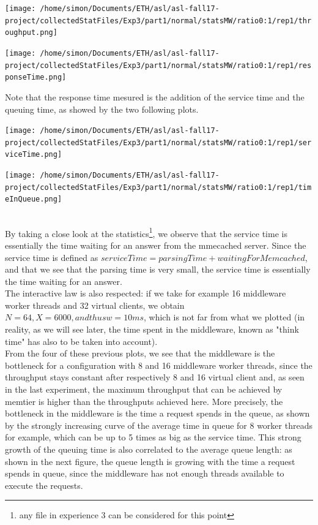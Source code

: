 \documentclass[11pt,a4paper]{article}
\begin{document}
\begin{center}
\texttt{[image: /home/simon/Documents/ETH/asl/asl-fall17-project/collectedStatFiles/Exp3/part1/normal/statsMW/ratio0:1/rep1/throughput.png]}
\end{center}
\begin{center}
\texttt{[image: /home/simon/Documents/ETH/asl/asl-fall17-project/collectedStatFiles/Exp3/part1/normal/statsMW/ratio0:1/rep1/responseTime.png]}
\end{center}

Note that the response time mesured is the addition of the service time and the queuing time, as showed by the two following plots. 
\\
\begin{minipage}{0.5\linewidth}
\texttt{[image: /home/simon/Documents/ETH/asl/asl-fall17-project/collectedStatFiles/Exp3/part1/normal/statsMW/ratio0:1/rep1/serviceTime.png]}
\end{minipage}
\hfill
\begin{minipage}{0.5\linewidth}
\texttt{[image: /home/simon/Documents/ETH/asl/asl-fall17-project/collectedStatFiles/Exp3/part1/normal/statsMW/ratio0:1/rep1/timeInQueue.png]}
\end{minipage}
\\
By taking a close look at the statistics\footnote{any file in experience 3 can be considered for this point}, we observe that the service time is essentially the time waiting for an answer from the mmecached server. Since the service time is defined as \(serviceTime = parsingTime + waitingForMemcached\), and that we see that the parsing time is very small, the service time is essentially the time waiting for an answer. 
\\
The interactive law is also respected: if we take for example 16 middleware worker threads and 32 virtual clients, we obtain \(N = 64, X = 6000, and thus w = 10 ms\), which is not far from what we plotted (in reality, as we will see later, the time spent in the middleware, known as "think time" has also to be taken into account). 
\\
From the four of these previous plots, we see that the middleware is the bottleneck for a configuration with 8 and 16 middleware worker threads, since the throughput stays constant after respectively 8 and 16 virtual client and, as seen in the last experiment, the maximum throughput that can be achieved by memtier is higher than the throughputs achieved here. More precisely, the bottleneck in the middleware is the time a request spends in the queue, as shown by the strongly increasing curve of the average time in queue for 8 worker threads for example, which can be up to 5 times as big as the service time. This strong growth of the queuing time is also correlated to the average queue length: as shown in the next figure, the queue length is growing with the time a request spends in queue, since the middleware has not enough threads available to execute the requests. 
\end{document}
